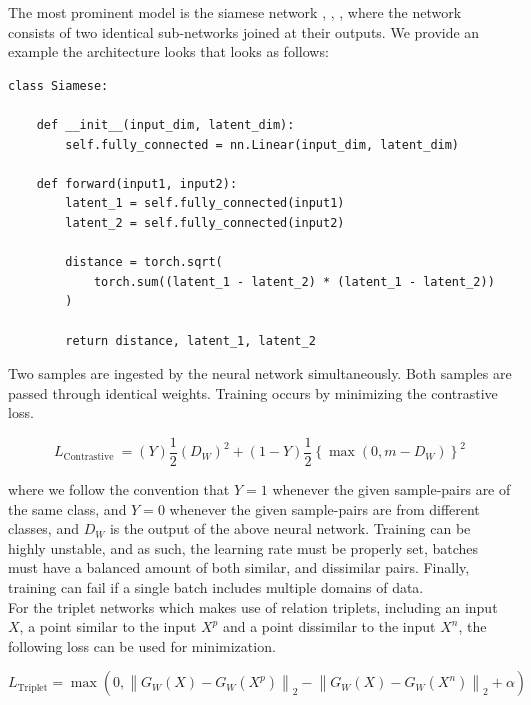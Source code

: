 \documentclass[a4paper,12pt,oneside,openright]{report}
\begin{document}
The most prominent model is the siamese network \cite{bromley94}, \cite{chopra05}, \cite{hadsell06}, where the network consists of two identical sub-networks joined at their outputs. 
We provide an example the architecture looks that looks as follows:

\begin{verbatim}
class Siamese:

    def __init__(input_dim, latent_dim):
        self.fully_connected = nn.Linear(input_dim, latent_dim)
        
    def forward(input1, input2):
        latent_1 = self.fully_connected(input1)
        latent_2 = self.fully_connected(input2)
        
        distance = torch.sqrt(
            torch.sum((latent_1 - latent_2) * (latent_1 - latent_2))
        )
        
        return distance, latent_1, latent_2
\end{verbatim}

Two samples are ingested by the neural network simultaneously.
Both samples are passed through identical weights.
Training occurs by minimizing the contrastive loss.

\begin{equation}
L_{\text {Contrastive }}=(Y) \frac{1}{2}\left(D_{W}\right)^{2}+(1-Y) \frac{1}{2}\left\{\max \left(0, m-D_{W}\right)\right\}^{2}
\end{equation}

where we follow the convention that $Y=1$ whenever the given sample-pairs are of the same class, and $Y=0$ whenever the given sample-pairs are from different classes, and $D_W$ is the output of the above neural network.
Training can be highly unstable, and as such, the learning rate must be properly set, batches must have a balanced amount of both similar, and dissimilar pairs. 
Finally, training can fail if a single batch includes multiple domains of data. \\

For the triplet networks \cite{hoffer14} which makes use of relation triplets, including an input $X$, a point similar to the input $X^p$ and a point dissimilar to the input $X^n$, the following loss can be used for minimization.

\begin{equation}
L_{\text {Triplet}}=\max \left(0,\left\|G_{W}(X)-G_{W}\left(X^{p}\right)\right\|_{2}-\left\|G_{W}(X)-G_{W}\left(X^{n}\right)\right\|_{2}+\alpha\right)
\end{equation} 
\end{document}
